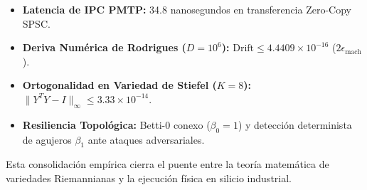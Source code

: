 \begin{itemize}
    \item \textbf{Latencia de IPC PMTP:} 34.8 nanosegundos en transferencia Zero-Copy SPSC.
    \item \textbf{Deriva Numérica de Rodrigues ($D=10^6$):} $\text{Drift} \le 4.4409 \times 10^{-16}$ ($2\epsilon_{\text{mach}}$).
    \item \textbf{Ortogonalidad en Variedad de Stiefel ($K=8$):} $\|Y^T Y - I\|_{\infty} \le 3.33 \times 10^{-14}$.
    \item \textbf{Resiliencia Topológica:} Betti-0 conexo ($\beta_0 = 1$) y detección determinista de agujeros $\beta_1$ ante ataques adversariales.
\end{itemize}

Esta consolidación empírica cierra el puente entre la teoría matemática de variedades Riemannianas y la ejecución física en silicio industrial.
